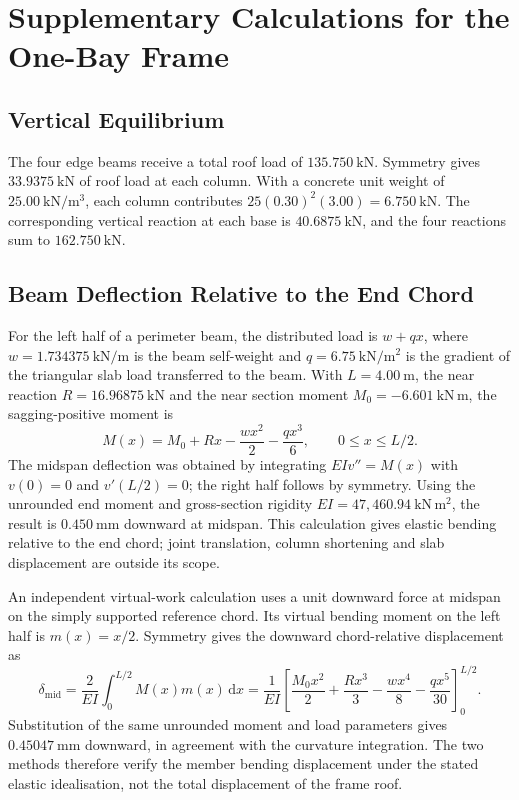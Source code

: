 \chapter{Supplementary Calculations for the One-Bay Frame}
\label{app:supabase_screenshots}

\section{Vertical Equilibrium}

The four edge beams receive a total roof load of \(135.750~\mathrm{kN}\). Symmetry gives \(33.9375~\mathrm{kN}\) of roof load at each column. With a concrete unit weight of \(25.00~\mathrm{kN/m^3}\), each column contributes \(25(0.30)^2(3.00)=6.750~\mathrm{kN}\). The corresponding vertical reaction at each base is \(40.6875~\mathrm{kN}\), and the four reactions sum to \(162.750~\mathrm{kN}\).

\section{Beam Deflection Relative to the End Chord}

For the left half of a perimeter beam, the distributed load is \(w+qx\), where \(w=1.734375~\mathrm{kN/m}\) is the beam self-weight and \(q=6.75~\mathrm{kN/m^2}\) is the gradient of the triangular slab load transferred to the beam. With \(L=4.00~\mathrm{m}\), the near reaction \(R=16.96875~\mathrm{kN}\) and the near section moment \(M_0=-6.601~\mathrm{kN\,m}\), the sagging-positive moment is
\[
  M(x)=M_0+Rx-\frac{wx^2}{2}-\frac{qx^3}{6},
  \qquad 0\leq x\leq L/2.
\]
The midspan deflection was obtained by integrating \(EI v''=M(x)\) with \(v(0)=0\) and \(v'(L/2)=0\); the right half follows by symmetry. Using the unrounded end moment and gross-section rigidity \(EI=47{,}460.94~\mathrm{kN\,m^2}\), the result is \(0.450~\mathrm{mm}\) downward at midspan. This calculation gives elastic bending relative to the end chord; joint translation, column shortening and slab displacement are outside its scope.

An independent virtual-work calculation uses a unit downward force at midspan on the simply supported reference chord. Its virtual bending moment on the left half is \(m(x)=x/2\). Symmetry gives the downward chord-relative displacement as
\[
 \delta_{\mathrm{mid}}=\frac{2}{EI}\int_0^{L/2}M(x)m(x)\,\mathrm{d}x
 =\frac{1}{EI}\left[\frac{M_0x^2}{2}+\frac{Rx^3}{3}-\frac{wx^4}{8}-\frac{qx^5}{30}\right]_0^{L/2}.
\]
Substitution of the same unrounded moment and load parameters gives \(0.45047~\mathrm{mm}\) downward, in agreement with the curvature integration. The two methods therefore verify the member bending displacement under the stated elastic idealisation, not the total displacement of the frame roof.

